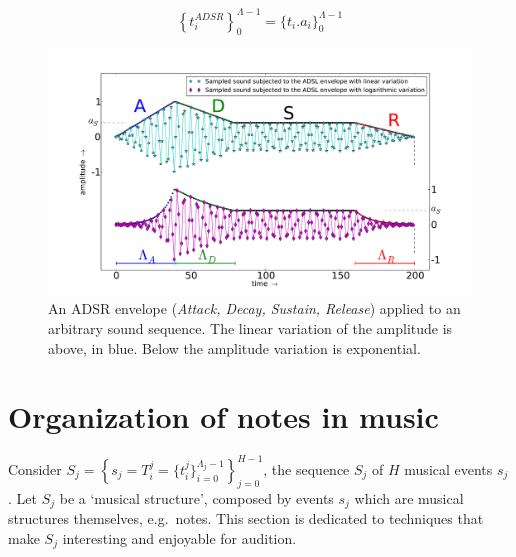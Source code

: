 \begin{equation}\label{eq:adsrApl}
\left\{t_i^{ADSR}\right\}_0^{\Lambda-1} =\{t_i . a_i\}_0^{\Lambda-1}
\end{equation}

\begin{figure}[htp!]
    \centering
        \includegraphics[width=\columnwidth]{figures/adsr}
    \caption{An ADSR envelope (\emph{Attack, Decay, Sustain, Release}) applied to an arbitrary sound sequence. The linear variation of the amplitude is above, in blue. Below the amplitude variation is exponential.}
        \label{fig:adsr}
\end{figure}





\section{Organization of notes in music}\label{notasMusica} \label{sec:notesMusic}

Consider $ S_j=\left\{  s_j=T_i^j=\{t_i^j\}_{i=0}^{\Lambda_j-1} \right\}_{j=0}^{H-1} $, the sequence $S_j$ of $H$ musical events $s_j$. Let $S_j$ be a `musical structure', composed by events $s_j$ which are musical structures themselves, e.g.\ notes. This section is dedicated to techniques that make $S_j$ interesting and enjoyable for audition.

